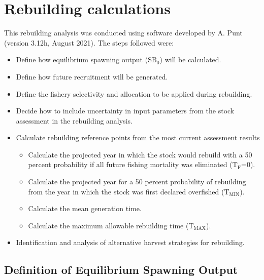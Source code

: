 \documentclass[11pt,
  english,
  a4paper,
]{article}
\begin{document}
\hypertarget{rebuilding-calculations}{%
\section{Rebuilding calculations}\label{rebuilding-calculations}}

\leavevmode\tagmcend\tagstructend


This rebuilding analysis was conducted using software developed by A. Punt (version 3.12h, August 2021). The steps followed were:

\leavevmode\tagmcend\tagstructend\par

\begin{itemize}
    \item Define how equilibrium spawning output ($\text{SB}_0$) will be calculated. 
    \item Define how future recruitment will be generated. 
    \item Define the fishery selectivity and allocation to be applied during rebuilding. 
    \item Decide how to include uncertainty in input parameters from the stock assessment in the rebuilding analysis. 
    \item Calculate rebuilding reference points from the most current assessment results 
    \begin{itemize}
        \item Calculate the projected year in which the stock would rebuild with a 50 percent probability if all future fishing mortality was eliminated ($\text{T}_\text{F}$=0).
        \item  Calculate the projected year for a 50 percent probability of rebuilding from the year in which the stock was first declared overfished ($\text{T}_\text{MIN}$). 
        \item Calculate the mean generation time. 
        \item Calculate the maximum allowable rebuilding time ($\text{T}_\text{MAX}$). 
    \end{itemize}
    \item Identification and analysis of alternative harvest strategies for rebuilding. 
\end{itemize}


\hypertarget{definition-of-equilibrium-spawning-output}{%
\subsection{Definition of Equilibrium Spawning Output}\label{definition-of-equilibrium-spawning-output}}
\end{document}
